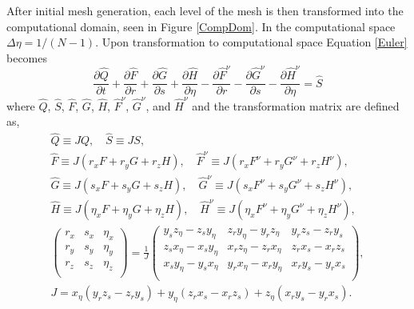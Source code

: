 \documentclass[draft]{aiaa-pretty}
\begin{document}
 After initial mesh generation, each level of the mesh is then transformed into the computational domain, seen in Figure \ref{CompDom}. In the computational space $\Delta \eta = 1/(N-1)$.
 Upon transformation to computational space Equation \ref{Euler} becomes
 \begin{equation}
  \frac{\partial \hat{Q}}{\partial t}+\frac{\partial \hat{F}}{\partial r}+\frac{\partial \hat{G}}{\partial s}+\frac{\partial \hat{H}}{\partial \eta}
  -\frac{\partial \hat{F}^\nu}{\partial r}-\frac{\partial \hat{G}^\nu}{\partial s}-\frac{\partial \hat{H}^\nu}{\partial \eta}=\hat{S} \label{ComSpace}
 \end{equation}
 where $\hat{Q}$, $\hat{S}$, $\hat{F}$, $\hat{G}$, $\hat{H}$, $\hat{F}^\nu$, $\hat{G}^\nu$, and $\hat{H}^\nu$ and the transformation matrix are defined as,
 \begin{gather*}
  \hat{Q} \equiv JQ, \quad \hat{S} \equiv JS, \\
  \hat{F}\equiv J \left(r_xF+r_yG+r_zH\right), \quad \hat{F}^\nu \equiv J\left(r_xF^\nu+r_yG^\nu+r_zH^\nu\right),  \\
  \hat{G}\equiv J \left(s_xF+s_yG+s_zH\right), \quad \hat{G}^\nu \equiv J\left(s_xF^\nu+s_yG^\nu+s_zH^\nu\right),  \\
  \hat{H}\equiv J \left(\eta_xF+\eta_yG+\eta_z H\right), \quad \hat{H}^\nu \equiv J\left(\eta_xF^\nu+\eta_yG^\nu+\eta_zH^\nu\right), \\
  \left(\begin{matrix}
   r_x & s_x & \eta_x \\
   r_y & s_y & \eta_y \\
   r_z & s_z & \eta_z \\
  \end{matrix}\right) = \frac{1}{J} \left( \begin{matrix}
  y_sz_\eta - z_sy_\eta & z_ry_\eta - y_rz_\eta & y_rz_s-z_ry_s \\
  z_sx_\eta - x_sy_\eta & x_rz_\eta - z_rx_\eta & z_rx_s-x_rz_s \\
  x_sy_\eta - y_sx_\eta & y_rx_\eta - x_ry_\eta & x_ry_s-y_rx_s \\
  \end{matrix} \right), \\
  J = x_\eta\left( y_rz_s-z_ry_s\right) + y_\eta\left( z_rx_s - x_rz_s \right) + z_\eta(x_ry_s-y_rx_s).
 \end{gather*}
\end{document}
